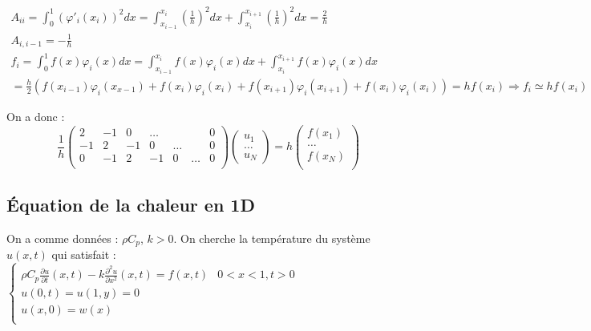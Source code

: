 \documentclass[../main.tex]{subfiles}
\begin{document}
\begin{equation}
    \begin{gathered}
    A_{ii} = \int_0^1 (\varphi'_i(x_i))^2dx = \int_{x_{i-1}}^{x_i} (\frac{1}{h})^2dx + \int_{x_i}^{x_{i+1}} (\frac{1}{h})^2dx = \frac{2}{h}\\
    A_{i,i-1} = -\frac{1}{h} \\
    f_i= \int_0^1 f(x) \varphi_i(x)dx = \int_{x_{i-1}}^{x_i} f(x)\varphi_i(x)dx + \int_{x_i}^{x_{i+1}} f(x)\varphi_i(x)dx\\
    = \frac{h}{2}(f(x_{i-1})\varphi_i(x_{x-1})+f(x_i) \varphi_i(x_i) + f(x_{i+1})\varphi_i(x_{i+1})+f(x_i)\varphi_i(x_i)) = hf(x_i) \Rightarrow f_i \simeq hf(x_i)
    \end{gathered}
\end{equation}

On a donc :\\
\begin{equation}
    \frac{1}{h} \begin{pmatrix}
        2 & -1 & 0 & \dots & & & 0\\
        -1 & 2 &-1 & 0 & \dots & & 0\\
        0 & -1 & 2 & -1 & 0& \dots & 0\\
    \end{pmatrix} \begin{pmatrix}
        u_1\\
        \dots \\
        u_N
    \end{pmatrix} = h \begin{pmatrix}
        f(x_1)\\
        \dots \\
        f(x_N)\\
    \end{pmatrix}
\end{equation} 

\subsection{Équation de la chaleur en 1D}
On a comme données : $\rho C_p$, $k >0$. On cherche la température du système $u(x,t)$ qui satisfait : $\begin{cases}
    \rho C_p \frac{\partial u}{\partial t}(x,t) - k \frac{\partial^2u}{\partial x^2}(x,t) = f(x,t) & 0<x<1, t>0\\
    u(0,t)=u(1,y)=0\\
    u(x,0)=w(x)\\
\end{cases}$\\
\end{document}
